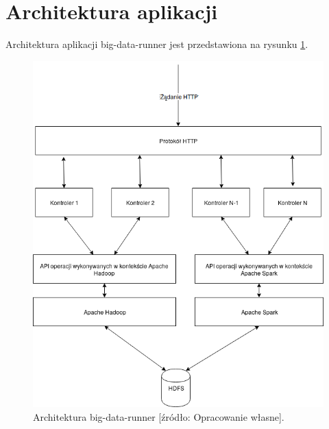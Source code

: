 \section{Architektura aplikacji}
Architektura aplikacji big-data-runner jest przedstawiona na rysunku \ref{fig:@=big-data-runner_arch}. 
\begin{figure}[!htb]
	\centering
	\includegraphics[scale=0.4]{big-data-runner-architecture.png}
	\caption{Architektura big-data-runner [źródło: Opracowanie własne].}
	\label{fig:@=big-data-runner_arch}
\end{figure}
